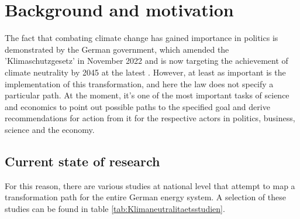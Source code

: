 \chapter{Background and motivation}

The fact that combating climate change has gained importance in politics is demonstrated by the German government, which amended the 'Klimaschutzgesetz' in November 2022 and is now targeting the achievement of climate neutrality by 2045 at the latest \cite{Klimaschutzgesetz2022}. However, at least as important is the implementation of this transformation, and here the law does not specify a particular path. At the moment, it's one of the most important tasks of science and economics to point out possible paths to the specified goal and derive recommendations for action from it for the respective actors in politics, business, science and the economy. 

\section{Current state of research}

For this reason, there are various studies at national level that attempt to map a transformation path for the entire German energy system. A selection of these studies can be found in table \ref{tab:Klimaneutralitaetsstudien}. 

\begin{table}[htbp]
\caption{The five biggest studies which which adress the transformation to a climate neutral germany in 2045.}
\label{tab:Klimaneutralitaetsstudien}
\end{table}

